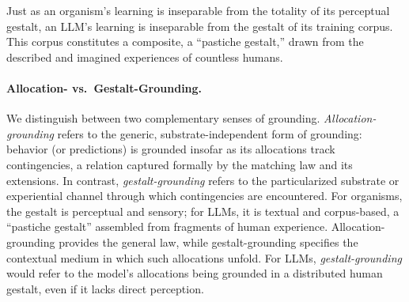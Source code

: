 \documentclass[11pt]{article}
\begin{document}
Just as an organism’s learning is inseparable from the totality of its
perceptual gestalt, an LLM’s learning is inseparable from the gestalt
of its training corpus. This corpus constitutes a composite, a
“pastiche gestalt,” drawn from the described and imagined experiences
of countless humans. 

\paragraph{Allocation- vs.\ Gestalt-Grounding.}
We distinguish between two complementary senses of grounding. 
\emph{Allocation-grounding} refers to the generic, substrate-independent form of
grounding: behavior (or predictions) is grounded insofar as its allocations
track contingencies, a relation captured formally by the matching law and its
extensions. In contrast, \emph{gestalt-grounding} refers to the particularized
substrate or experiential channel through which contingencies are encountered.
For organisms, the gestalt is perceptual and sensory; for LLMs, it is textual
and corpus-based, a ``pastiche gestalt'' assembled from fragments of human
experience. Allocation-grounding provides the general law, while
gestalt-grounding specifies the contextual medium in which such allocations
unfold. For LLMs, \emph{gestalt-grounding} would refer to the model’s allocations being
grounded in a distributed human gestalt, even if it lacks direct
perception.
\end{document}
